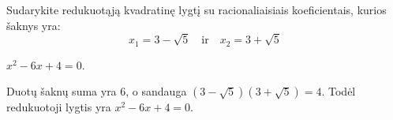 \begin{salyga}
Sudarykite redukuotąją kvadratinę lygtį su racionaliaisiais koeficientais, kurios šaknys yra:
    \[ x_1 = 3 - \sqrt{5} \quad \text{ir} \quad x_2 = 3 + \sqrt{5} \]
\end{salyga}

\begin{atsakymas}
$x^2-6x+4=0$.
\end{atsakymas}

\begin{sprendimas}
Duotų šaknų suma yra $6$, o sandauga $(3-\sqrt5)(3+\sqrt5)=4$. Todėl redukuotoji lygtis yra $x^2-6x+4=0$.
\end{sprendimas}

